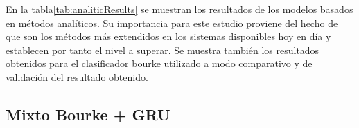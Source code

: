 
En la tabla\ref{tab:analiticResults} se muestran los resultados de los modelos basados en métodos analíticos. Su importancia para este estudio proviene del hecho de que son los métodos más extendidos en los sistemas disponibles hoy en día y establecen por tanto el nivel a superar. Se muestra también los resultados obtenidos para el clasificador bourke utilizado a modo comparativo y de validación del resultado obtenido.

\begin{comment}
\tablas{tab:analiticResults}{Resultados de sistemas basados en métodos analíticos}{l|c|c|c|c}{
              & \emph{iFell} & \emph{iFell} & \emph{SisFALL} & \emph{SisFALL} \\
              & Bourke    & Hibrido & Cotas(SumVect)  & Cotas(SV) 100\%Sens \\ \midrule
Sensitividad (\%) & 99,4  &    91,13   & 94,28 & 100  \\
Especificidad (\%) & 29,7 &   42,88    & 96,13 & 32,9 \\
Accuracy (\%) & 64,55 &     67  & 95,21 & 66,43 \\
Tiempo (s)    & 0     & 2,5     & 0       & \\
}{3}
\warn{Falta extraer Lim2014 con sisfall y comparar}
\end{comment}
\subsection{Mixto Bourke + GRU}




